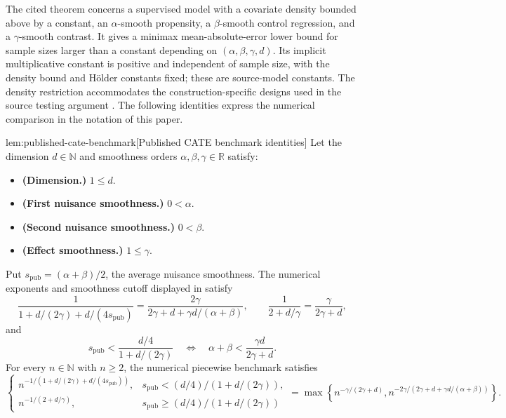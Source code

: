 \documentclass[11pt]{article}
\begin{document}
The cited theorem concerns a supervised model with a covariate density bounded above by a constant, an \(\alpha\)-smooth propensity, a \(\beta\)-smooth control regression, and a \(\gamma\)-smooth contrast. It gives a minimax mean-absolute-error lower bound for sample sizes larger than a constant depending on \((\alpha,\beta,\gamma,d)\). Its implicit multiplicative constant is positive and independent of sample size, with the density bound and H\"older constants fixed; these are source-model constants. The density restriction accommodates the construction-specific designs used in the source testing argument \citep[Section 3.1]{KennedyBalakrishnanRobinsWasserman2024}. The following identities express the numerical comparison in the notation of this paper.

\begin{lemmav}{lem:published-cate-benchmark}[Published CATE benchmark identities]
Let the dimension \(d\in\mathbb N\) and smoothness orders \(\alpha,\beta,\gamma\in\mathbb R\) satisfy:
\begin{itemize}
\item \textbf{(Dimension.)} \(1\le d\).
\item \textbf{(First nuisance smoothness.)} \(0<\alpha\).
\item \textbf{(Second nuisance smoothness.)} \(0<\beta\).
\item \textbf{(Effect smoothness.)} \(1\le\gamma\).
\end{itemize}
Put \(s_{\mathrm{pub}}=(\alpha+\beta)/2\), the average nuisance smoothness. The numerical exponents and smoothness cutoff displayed in \citet[Section 3, Theorem 1]{KennedyBalakrishnanRobinsWasserman2024} satisfy
\[
\frac{1}{1+d/(2\gamma)+d/(4s_{\mathrm{pub}})}
=\frac{2\gamma}{2\gamma+d+\gamma d/(\alpha+\beta)},
\qquad
\frac{1}{2+d/\gamma}=\frac{\gamma}{2\gamma+d},
\]
and
\[
s_{\mathrm{pub}}<\frac{d/4}{1+d/(2\gamma)}
\quad\Longleftrightarrow\quad
\alpha+\beta<\frac{\gamma d}{2\gamma+d}.
\]
For every \(n\in\mathbb N\) with \(n\ge2\), the numerical piecewise benchmark satisfies
\[
\begin{cases}
n^{-1/(1+d/(2\gamma)+d/(4s_{\mathrm{pub}}))},
& s_{\mathrm{pub}}<(d/4)/(1+d/(2\gamma)),\\
n^{-1/(2+d/\gamma)},
& s_{\mathrm{pub}}\ge(d/4)/(1+d/(2\gamma))
\end{cases}
=
\max\left\{
n^{-\gamma/(2\gamma+d)},
n^{-2\gamma/(2\gamma+d+\gamma d/(\alpha+\beta))}
\right\}.
\]
\end{lemmav}
\end{document}
